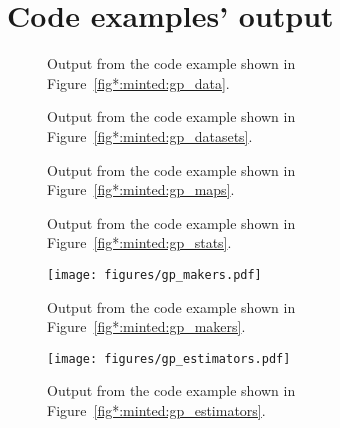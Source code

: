 \documentclass[longauth]{aa}
\begin{document}



\appendix
\section{Code examples' output}

\begin{figure}[!ht]
        \small
        \caption{Output from the code example shown in Figure~\ref{fig*:minted:gp_data}.}
        \label{fig:code_example_gp_data}
\end{figure}


\begin{figure}[!ht]
        \small
        \caption{Output from the code example shown in Figure~\ref{fig*:minted:gp_datasets}.}
        \label{fig:code_example_gp_datasets}
\end{figure}

\begin{figure}[!ht]
        \small
        \caption{Output from the code example shown in Figure~\ref{fig*:minted:gp_maps}.}
        \label{fig:code_example_gp_maps}
\end{figure}


\begin{figure}[!ht]
        \small
        \caption{Output from the code example shown in Figure~\ref{fig*:minted:gp_stats}.}
        \label{fig:code_example_gp_stats}
\end{figure}


\begin{figure*}[!ht]
        \centering
        \texttt{[image: figures/gp\_makers.pdf]}
        \caption{Output from the code example shown in Figure~\ref{fig*:minted:gp_makers}.}
        \label{fig:code_example_gp_makers}
\end{figure*}


\begin{figure*}[!ht]
        \centering
        \texttt{[image: figures/gp\_estimators.pdf]}
        \caption{Output from the code example shown in Figure~\ref{fig*:minted:gp_estimators}.}
        \label{fig:code_example_gp_estimators}
\end{figure*}
\end{document}
